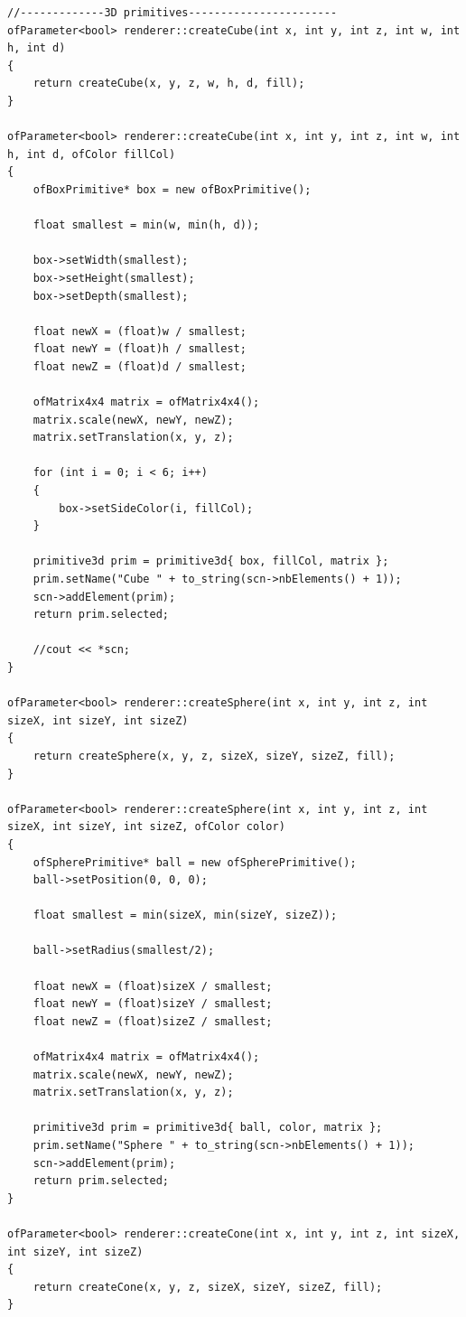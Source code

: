 \newpage

\begin{lstlisting}
//-------------3D primitives-----------------------
ofParameter<bool> renderer::createCube(int x, int y, int z, int w, int h, int d)
{
	return createCube(x, y, z, w, h, d, fill);
}

ofParameter<bool> renderer::createCube(int x, int y, int z, int w, int h, int d, ofColor fillCol)
{
	ofBoxPrimitive* box = new ofBoxPrimitive();
	
	float smallest = min(w, min(h, d));
	
	box->setWidth(smallest);
	box->setHeight(smallest);
	box->setDepth(smallest);
	
	float newX = (float)w / smallest;
	float newY = (float)h / smallest;
	float newZ = (float)d / smallest;
	
	ofMatrix4x4 matrix = ofMatrix4x4();
	matrix.scale(newX, newY, newZ);
	matrix.setTranslation(x, y, z);
	
	for (int i = 0; i < 6; i++)
	{
		box->setSideColor(i, fillCol);
	}
	
	primitive3d prim = primitive3d{ box, fillCol, matrix };
	prim.setName("Cube " + to_string(scn->nbElements() + 1));
	scn->addElement(prim);
	return prim.selected;
	
	//cout << *scn;
}

ofParameter<bool> renderer::createSphere(int x, int y, int z, int sizeX, int sizeY, int sizeZ)
{
	return createSphere(x, y, z, sizeX, sizeY, sizeZ, fill);
}

ofParameter<bool> renderer::createSphere(int x, int y, int z, int sizeX, int sizeY, int sizeZ, ofColor color)
{
	ofSpherePrimitive* ball = new ofSpherePrimitive();
	ball->setPosition(0, 0, 0);
	
	float smallest = min(sizeX, min(sizeY, sizeZ));
	
	ball->setRadius(smallest/2);
	
	float newX = (float)sizeX / smallest;
	float newY = (float)sizeY / smallest;
	float newZ = (float)sizeZ / smallest;
	
	ofMatrix4x4 matrix = ofMatrix4x4();
	matrix.scale(newX, newY, newZ);
	matrix.setTranslation(x, y, z);
	
	primitive3d prim = primitive3d{ ball, color, matrix };
	prim.setName("Sphere " + to_string(scn->nbElements() + 1));
	scn->addElement(prim);
	return prim.selected;
}

ofParameter<bool> renderer::createCone(int x, int y, int z, int sizeX, int sizeY, int sizeZ)
{
	return createCone(x, y, z, sizeX, sizeY, sizeZ, fill);
}


\end{lstlisting}

